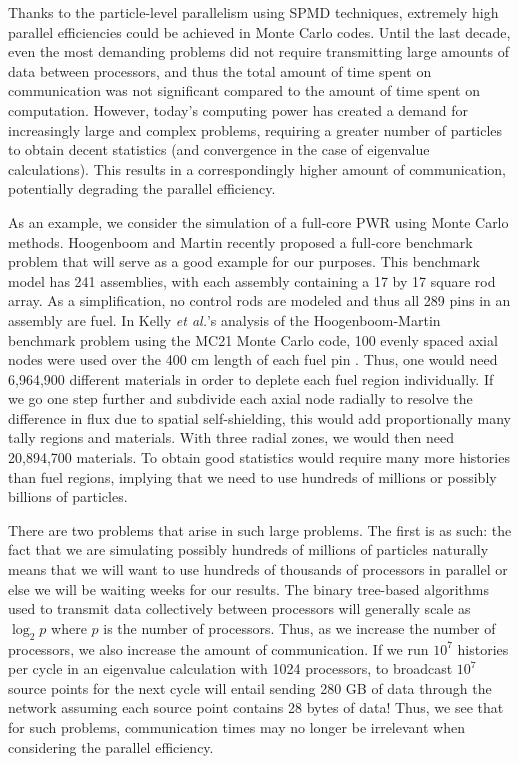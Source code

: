 Thanks to the particle-level parallelism using SPMD techniques,
extremely high parallel efficiencies could be achieved in Monte Carlo
codes. Until the last decade, even the most demanding problems did not
require transmitting large amounts of data between processors, and
thus the total amount of time spent on communication was not
significant compared to the amount of time spent on
computation. However, today's computing power has created a demand for
increasingly large and complex problems, requiring a greater number of
particles to obtain decent statistics (and convergence in the case of
eigenvalue calculations). This results in a correspondingly higher
amount of communication, potentially degrading the parallel
efficiency.

As an example, we consider the simulation of a full-core PWR using
Monte Carlo methods. Hoogenboom and Martin recently proposed a
full-core benchmark problem \cite{hoogenboom} that will serve as a
good example for our purposes. This benchmark model has 241
assemblies, with each assembly containing a 17 by 17 square rod
array. As a simplification, no control rods are modeled and thus all
289 pins in an assembly are fuel. In Kelly {\em et al.}'s analysis of
the Hoogenboom-Martin benchmark problem using the MC21 Monte Carlo
code, 100 evenly spaced axial nodes were used over the 400 cm length
of each fuel pin \cite{kelly}. Thus, one would need 6,964,900
different materials in order to deplete each fuel region
individually. If we go one step further and subdivide each axial node
radially to resolve the difference in flux due to spatial
self-shielding, this would add proportionally many tally regions and
materials. With three radial zones, we would then need 20,894,700
materials. To obtain good statistics would require many more histories
than fuel regions, implying that we need to use hundreds of millions
or possibly billions of particles.

There are two problems that arise in such large problems. The first is
as such: the fact that we are simulating possibly hundreds of millions
of particles naturally means that we will want to use hundreds of
thousands of processors in parallel or else we will be waiting weeks
for our results. The binary tree-based algorithms used to transmit
data collectively between processors will generally scale as $\log_2
p$ where $p$ is the number of processors. Thus, as we increase the
number of processors, we also increase the amount of communication. If
we run $10^7$ histories per cycle in an eigenvalue calculation with
1024 processors, to broadcast $10^7$ source points for the next cycle
will entail sending 280 GB of data through the network assuming each
source point contains 28 bytes of data! Thus, we see that for such
problems, communication times may no longer be irrelevant when
considering the parallel efficiency.

